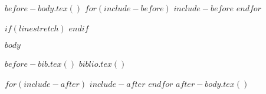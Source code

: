 \documentclass{juliacon}
\begin{document}
$before-body.tex()$
$for(include-before)$
$include-before$
$endfor$

$if(linestretch)$
$endif$

$body$

$before-bib.tex()$
$biblio.tex()$

$for(include-after)$
$include-after$
$endfor$
$after-body.tex()$
\end{document}

